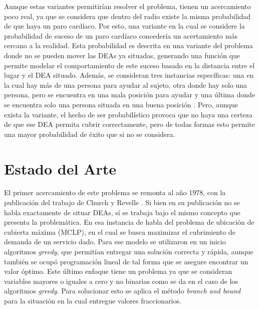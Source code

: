 \documentclass[letter, 10pt]{article}
\begin{document}
Aunque estas variantes permitir\'ian resolver el problema, tienen un acercamiento poco real, ya que se considera que dentro del radio existe la misma probabilidad de que haya un paro card\'iaco. Por esto, una variante en la cual se considere la probabilidad de suceso de un paro card\'iaco conceder\'ia un acertamiento m\'as cercano a la realidad. Esta probabilidad es descrita en una variante del problema donde no se pueden mover las DEAs ya situadas, generando una funci\'on que permite modelar el comportamiento de este suceso basado en la distancia entre el lugar y el DEA situado. Adem\'as, se consideran tres instancias espec\'ificas: una en la cual hay m\'as de una persona para ayudar al sujeto, otra donde hay solo una persona, pero se encuentra en una mala posici\'on para ayudar y una \'ultima donde se encuentra solo una persona situada en una buena posici\'on \cite{ChanDemir}. Pero, aunque exista la variante, el hecho de ser probabil\'istico provoca que no haya una certeza de que ese DEA permita cubrir correctamente, pero de todas formas esto permite una mayor probabilidad de \'exito que si no se considera. 

\section{Estado del Arte}
El primer acercamiento de este problema se remonta al a\~no 1978, con la publicaci\'on del trabajo de Church y Revelle \cite{Church}. Si bien en su publicaci\'on no se habla exactamente de situar DEAs, s\'i se trabaja bajo el mismo concepto que presenta la problem\'atica. En esa instancia de habla del problema de ubicaci\'on de cubierta m\'axima (MCLP), en el cual se busca maximizar el cubrimiento de demanda de un servicio dado. Para ese modelo se utilizaron en un inicio algoritmos \textit{greedy}, que permit\'ian entregar una soluci\'on correcta y r\'apida, aunque tambi\'en se ocup\'o programaci\'on lineal de tal forma que se asegure encontrar  un valor \'optimo. Este \'ultimo enfoque tiene un problema ya que se consideran variables mayores o iguales a cero y no binarias como se da en el caso de los algoritmos \textit{greedy}. Para solucionar esto se aplica el m\'etodo \textit{branch and bound} para la situaci\'on en la cual entregue valores fraccionarios. 
\end{document}
